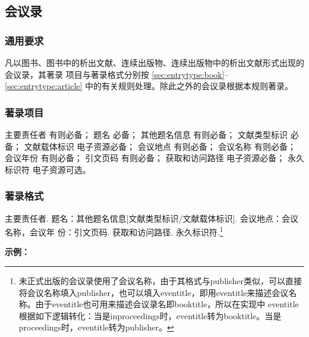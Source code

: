 \documentclass[twoside]{article}%
\begin{document}
\subsection{会议录}\label{sec:entrytype:proceed}

\subsubsection{通用要求}

凡以图书、图书中的析出文献、连续出版物、连续出版物中的析出文献形式出现的会议录，其著录
项目与著录格式分别按 \ref{sec:entrytype:book}--\ref{sec:entrytype:article} 中的有关规则处理。除此之外的会议录根据本规则著录。

\subsubsection{著录项目}

主要责任者 有则必备；
题名 必备；
其他题名信息 有则必备；
文献类型标识 必备；
文献载体标识 电子资源必备；
会议地点 有则必备；
会议名称 有则必备；
会议年份 有则必备；
引文页码 有则必备；
获取和访问路径 电子资源必备；
永久标识符 电子资源可选。

\subsubsection{著录格式}
主要责任者. 题名：其他题名信息[文献类型标识/文献载体标识]. 会议地点：会议名称，会议年
份：引文页码. 获取和访问路径. 永久标识符.\footnote{未正式出版的会议录使用了会议名称，由于其格式与publisher类似，可以直接将会议名称填入publisher，也可以填入eventitle，即用eventitle来描述会议名称。由于eventitle也可用来描述会议录名即booktitle，所以在实现中 eventitle 根据如下逻辑转化：当是inproceedings时，eventitle转为booktitle。当是proceedings时，eventitle转为publisher。}


\begin{refsection}
\nocite{王莉2023--,牛志明2012--,中国社会科学院台湾史研究中心2012--,肖希明2024民国}
\nocite{汪学军2002-22-25,贾东琴2011-45-52a,陈志勇2011--}
\nocite{WANG2022ACAIT,HU2024SSDBM,Yufin2000--}
\nocite{Babu2014--,FOURNEY1971-17-38}

{

\textbf{示例：}

{\printbibliography[heading=none,env=indentegenv]}
}
\end{refsection}
\end{document}
